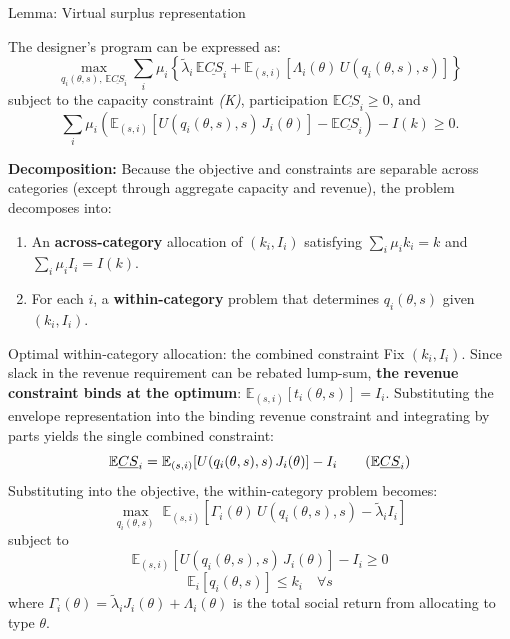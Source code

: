 \documentclass[10pt, aspectratio=169]{beamer}
\newcommand{\E}{\mathbb{E}}
\begin{document}
\begin{frame}{Lemma: Virtual surplus representation}
\begin{lemma}
The designer's program can be expressed as:
\[ \max_{q_i(\theta,s),\, \E\underline{CS}_i} \sum_i \mu_i \left\{ \tilde{\lambda}_i\, \E\underline{CS}_i + \E_{(s,i)}\!\left[\Lambda_i(\theta)\, U(q_i(\theta,s),s)\right] \right\} \tag{CS} \]
subject to the capacity constraint \emph{(K)}, participation $\E\underline{CS}_i \geq 0$, and
\[ \sum_i \mu_i \left(\E_{(s,i)}\!\left[U(q_i(\theta,s),s)\, J_i(\theta)\right] - \E\underline{CS}_i\right) - I(k) \geq 0. \tag{R} \]
\end{lemma}
\vspace{0.2cm}
\textbf{Decomposition:} Because the objective and constraints are separable across categories (except through aggregate capacity and revenue), the problem decomposes into:
\begin{enumerate}
\item An \textbf{across-category} allocation of $(k_i, I_i)$ satisfying $\sum_i \mu_i k_i = k$ and $\sum_i \mu_i I_i = I(k)$.
\item For each $i$, a \textbf{within-category} problem that determines $q_i(\theta,s)$ given $(k_i, I_i)$.
\end{enumerate}
\end{frame}

\begin{frame}{Optimal within-category allocation: the combined constraint}
Fix $(k_i, I_i)$. Since slack in the revenue requirement can be rebated lump-sum, \textbf{the revenue constraint binds at the optimum}: $\E_{(s,i)}[t_i(\theta,s)] = I_i$.
\vspace{0.2cm}
Substituting the envelope representation into the binding revenue constraint and integrating by parts yields the single combined constraint:
\[ \E\underline{CS}_i = \E_{(s,i)}\!\left[U(q_i(\theta,s),s)\, J_i(\theta)\right] - I_i \tag{$\E\underline{CS}_i$} \]
Substituting into the objective, the within-category problem becomes:
\[ \max_{q_i(\theta,s)}\; \E_{(s,i)}\!\left[\Gamma_i(\theta)\, U(q_i(\theta,s),s) - \tilde{\lambda}_i I_i\right] \tag{CS$_i$} \]
subject to
\[ \E_{(s,i)}\!\left[U(q_i(\theta,s),s)\, J_i(\theta)\right] - I_i \geq 0 \tag{IR-R$_i$} \]
\[ \E_i\!\left[q_i(\theta,s)\right] \leq k_i \quad \forall s \tag{K$_i$} \]
where $\Gamma_i(\theta) = \tilde{\lambda}_i J_i(\theta) + \Lambda_i(\theta)$ is the total social return from allocating to type $\theta$.
\end{frame}
\end{document}
